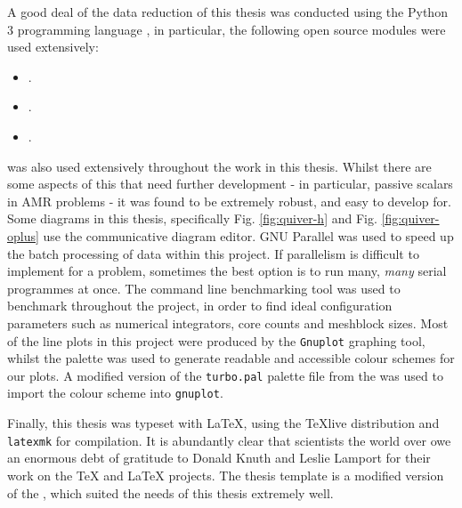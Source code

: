 A good deal of the data reduction of this thesis was conducted using the Python 3 programming language \parencite{10.5555/1593511}, in particular, the following open source modules were used extensively:

\begin{itemize}
  \item {} \parencite{harris2020array}.
  \item {} \parencite{astropy:2013,astropy:2018}.
  \item {} \parencite{Hunter:2007}.
\end{itemize}

\noindent
\athena{} \parencite{athena} was also used extensively throughout the work in this thesis.
Whilst there are some aspects of this that need further development - in particular, passive scalars in AMR problems - it was found to be extremely robust, and easy to develop for.
Some diagrams in this thesis, specifically Fig. \ref{fig:quiver-h} and Fig. \ref{fig:quiver-oplus} use the  communicative diagram editor.
GNU Parallel \parencite{tange_2021_5523272} was used to speed up the batch processing of data within this project.
If parallelism is difficult to implement for a problem, sometimes the best option is to run many, \textit{many} serial programmes at once.
The  command line benchmarking tool was used to benchmark \athena{} throughout the project, in order to find ideal configuration parameters such as numerical integrators, core counts and meshblock sizes.
Most of the line plots in this project were produced by the \texttt{Gnuplot} graphing tool, whilst the  palette was used to generate readable and accessible colour schemes for our plots.
A modified version of the \texttt{turbo.pal} palette file from the  was used to import the colour scheme into \texttt{gnuplot}.

Finally, this thesis was typeset with \LaTeX{}, using the {\TeX}live distribution and \texttt{latexmk} for compilation.
It is abundantly clear that scientists the world over owe an enormous debt of gratitude to Donald Knuth and Leslie Lamport for their work on the \TeX{} and \LaTeX{} projects.
The thesis template is a modified version of the , which suited the needs of this thesis extremely well.

